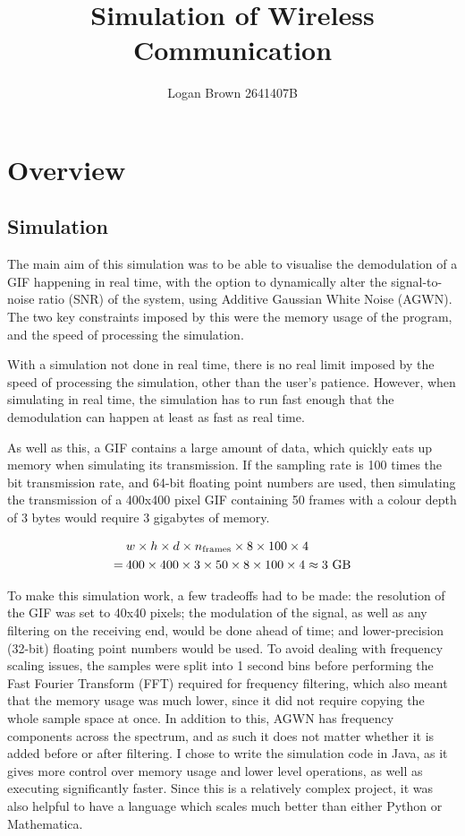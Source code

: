 \documentclass{article}
\title{Simulation of Wireless Communication}
\author{Logan Brown 2641407B}
\begin{document}
\maketitle
\section{Overview}
\subsection{Simulation}
The main aim of this simulation was to be able to visualise the demodulation of a GIF happening in real time, with the option to dynamically alter the signal-to-noise ratio (SNR) of the system, using Additive Gaussian White Noise (AGWN). The two key constraints imposed by this were the memory usage of the program, and the speed of processing the simulation.

With a simulation not done in real time, there is no real limit imposed by the speed of processing the simulation, other than the user's patience. However, when simulating in real time, the simulation has to run fast enough that the demodulation can happen at least as fast as real time.

As well as this, a GIF contains a large amount of data, which quickly eats up memory when simulating its transmission. If the sampling rate is 100 times the bit transmission rate, and 64-bit floating point numbers are used, then simulating the transmission of a 400x400 pixel GIF containing 50 frames with a colour depth of 3 bytes would require 3 gigabytes of memory.

\begin{equation}
    \begin{aligned}
             & w \times h \times d \times n_{\text{frames}} \times 8 \times 100 \times 4                  \\
        = \: & 400 \times 400 \times 3 \times 50 \times 8 \times 100 \times 4 \approx 3 \text{ GB} \notag
    \end{aligned}
\end{equation}

To make this simulation work, a few tradeoffs had to be made: the resolution of the GIF was set to 40x40 pixels; the modulation of the signal, as well as any filtering on the receiving end, would be done ahead of time; and lower-precision (32-bit) floating point numbers would be used. To avoid dealing with frequency scaling issues, the samples were split into 1 second bins before performing the Fast Fourier Transform (FFT) required for frequency filtering, which also meant that the memory usage was much lower, since it did not require copying the whole sample space at once. In addition to this, AGWN has frequency components across the spectrum, and as such it does not matter whether it is added before or after filtering. I chose to write the simulation code in Java, as it gives more control over memory usage and lower level operations, as well as executing significantly faster. Since this is a relatively complex project, it was also helpful to have a language which scales much better than either Python or Mathematica.
\end{document}
